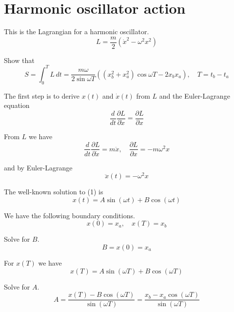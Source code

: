 


\section*{Harmonic oscillator action}

This is the Lagrangian for a harmonic oscillator.
\begin{equation*}
L=\frac{m}{2}(\dot x^2-\omega^2x^2)
\end{equation*}

Show that
\begin{equation*}
S=\int_0^TL\,dt=\frac{m\omega}{2\sin\omega T}
\left((x_b^2+x_a^2)\cos\omega T-2x_bx_a\right),\quad
T=t_b-t_a
\end{equation*}

The first step is to derive $x(t)$ and $\dot x(t)$ from $L$ and the Euler-Lagrange equation
\begin{equation*}
\frac{d}{dt}\frac{\partial L}{\partial\dot x}=\frac{\partial L}{\partial x}
\end{equation*}

From $L$ we have
\begin{equation*}
\frac{d}{dt}\frac{\partial L}{\partial\dot x}=m\ddot x,\quad
\frac{\partial L}{\partial x}=-m\omega^2x
\end{equation*}

and by Euler-Lagrange
\begin{equation*}
\ddot x(t)=-\omega^2x
\tag{1}
\end{equation*}

The well-known solution to (1) is
\begin{equation*}
x(t)=A\sin(\omega t)+B\cos(\omega t)
\end{equation*}

We have the following boundary conditions.
\begin{equation*}
x(0)=x_a,\quad
x(T)=x_b
\tag{2}
\end{equation*}

Solve for $B$.
\begin{equation*}
B=x(0)=x_a
\end{equation*}

For $x(T)$ we have
\begin{equation*}
x(T)=A\sin(\omega T)+B\cos(\omega T)
\end{equation*}

Solve for $A$.
\begin{equation*}
A=\frac{x(T)-B\cos(\omega T)}{\sin(\omega T)}=
\frac{x_b-x_a\cos(\omega T)}{\sin(\omega T)}
\end{equation*}

